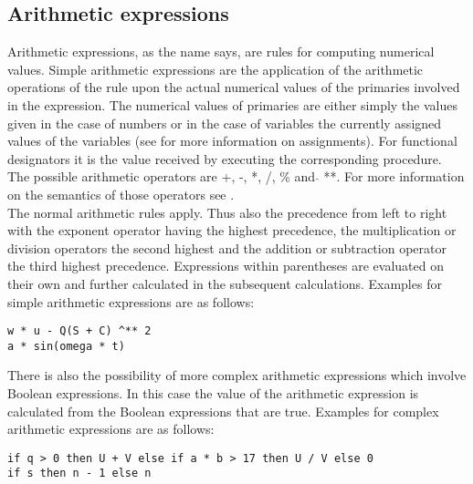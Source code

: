 \documentclass{article}
\begin{document}
\subsection{Arithmetic expressions} \label{arithexp}
Arithmetic expressions, as the name says, are rules for computing numerical values. Simple arithmetic expressions are the application of the arithmetic operations of the rule upon the actual numerical values of the primaries involved in the expression. The numerical values of primaries are either simply the values given in the case of numbers or in the case of variables the currently assigned values of the variables (see  for more information on assignments). For functional designators it is the value received by executing the corresponding procedure.\\
The possible arithmetic operators are +, -, *, /, \% and $\hat{}$ **. For more information on the semantics of those operators see .\\
 The normal arithmetic rules apply. Thus also the precedence from left to right with the exponent operator having the highest precedence, the multiplication or division operators the second highest and the addition or subtraction operator the third highest precedence. Expressions within parentheses are evaluated on their own and further calculated in the subsequent calculations. Examples for simple arithmetic expressions are as follows:\\

\begin{lstlisting}[language={[60]algol}]
w * u - Q(S + C) ^** 2
a * sin(omega * t)
\end{lstlisting}

There is also the possibility of more complex arithmetic expressions which involve Boolean expressions. In this case the value of the arithmetic expression is calculated from the Boolean expressions that are true. Examples for complex arithmetic expressions are as follows:\\

\begin{lstlisting}[language={[60]algol}]
if q > 0 then U + V else if a * b > 17 then U / V else 0
if s then n - 1 else n
\end{lstlisting}
\end{document}
